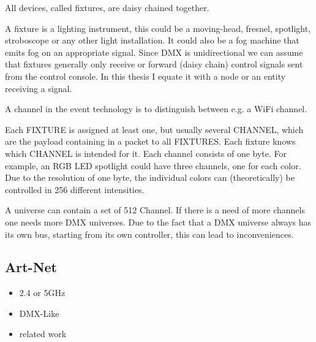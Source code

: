 \documentclass[]{ccs-thesis}
\begin{document}
All devices, called fixtures, are daisy chained together.

A fixture is a lighting instrument, 
this could be a moving-head, fresnel, spotlight, stroboscope or any other light installation.
It could also be a fog machine that emits fog on an appropriate signal.
Since \ac{DMX} is unidirectional we  can assume that fixtures generally only receive or forward (daisy chain) control signals sent from the control console.
In this thesis I equate it with a node or an entity receiving a signal.

A channel in the event technology is to distinguish between e.g. a WiFi channel. 

Each FIXTURE is assigned at least one, but usually several CHANNEL, which are the payload containing in a packet to all FIXTURES. 
Each fixture knows which CHANNEL is intended for it. Each channel consists of one byte.
For example, an RGB LED spotlight could have three channels, one for each color.
Due to the resolution of one byte, the individual colors can (theoretically) be controlled in 256 different intensities.

A universe can contain a set of 512 Channel. If there is a need of more channels one needs more DMX universes.
Due to the fact that a DMX universe always has its own bus, starting from its own controller, this can lead to inconveniences.

\subsection{Art-Net}
\label{sec:artnet}
\begin{itemize}
\item 2.4 or 5GHz
\item DMX-Like
\item related work
\end{itemize}
\end{document}
